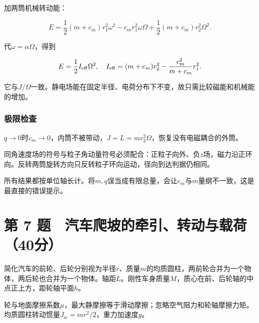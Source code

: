 \documentclass[12pt,a4paper,fontset=fandol]{ctexart}
\begin{document}
加两筒机械转动能：

\[
E=\frac12(m+c_m)r_1^2\omega^2
-c_mr_1^2\omega\Omega
+\frac12(m+c_m)r_2^2\Omega^2.
\]

代\(\omega=\alpha\Omega\)，得到

\[
E=\frac12I_{\rm eff}\Omega^2,\quad
I_{\rm eff}=(m+c_m)r_2^2-\frac{c_m^2}{m+c_m}r_1^2.
\]

它与\(J/\Omega\)一致。静电场能在固定半径、电荷分布下不变，故只需比较磁能和机械能的增加。

\subsubsection{极限检查}\label{ux6781ux9650ux68c0ux67e5}

\(q\to0\)时\(c_m\to0\)，内筒不被带动，\(J=L=m r_2^2\Omega\)，恢复没有电磁耦合的外筒。

同角速度场的符号与粒子角动量符号必须配合：正粒子向外、负\(z\)场，磁力沿正环向。反转两筒旋转方向只反转粒子环向运动，径向到达判据仍相同。

所有结果都按单位轴长计。将\(m,q\)误当成有限总量，会让\(c_m\)与\(m\)量纲不一致，这是最直接的错误提示。

\clearpage

\section{第 7
题　汽车爬坡的牵引、转动与载荷（40分）}\label{ux7b2c-7-ux9898-ux6c7dux8f66ux722cux5761ux7684ux7275ux5f15ux8f6cux52a8ux4e0eux8f7dux837740ux5206}

简化汽车的前轮、后轮分别视为半径\(r\)、质量\(m\)的均质圆柱，两前轮合并为一个物体，两后轮也合并为一个物体。轴距\(L\)。刚性车身质量\(M\)，质心在前、后轮轴的中点正上方，距轮轴平面\(h\)。

轮与地面摩擦系数\(\mu\)，最大静摩擦等于滑动摩擦；忽略空气阻力和轮轴摩擦力矩。均质圆柱转动惯量\(J_w=mr^2/2\)，重力加速度\(g\)。

\begin{center}
\begin{minipage}{\linewidth}
\centering\begingroup{}
\ifdim\wd\diagrambox>.88\linewidth
\sbox{\diagrambox}{\resizebox{.88\linewidth}{!}{\usebox{\diagrambox}}}\fi
\ifdim\ht\diagrambox>.38\textheight
\resizebox{!}{.38\textheight}{\usebox{\diagrambox}}
\else\usebox{\diagrambox}\fi
\par{}\endgroup\end{minipage}\end{center}
\end{document}
